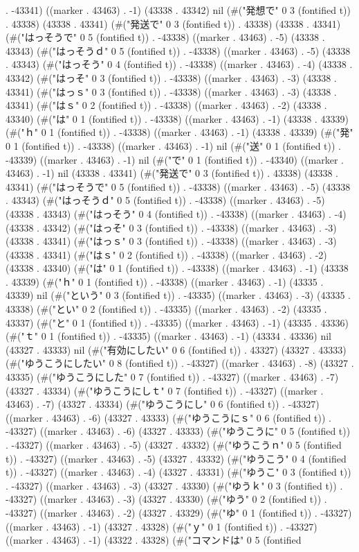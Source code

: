 . -43341) ((marker . 43463) . -1) (43338 . 43342) nil (#("発想で" 0 3 (fontified t)) . 43338) (43338 . 43341) (#("発送で" 0 3 (fontified t)) . 43338) (43338 . 43341) (#("はっそうで" 0 5 (fontified t)) . -43338) ((marker . 43463) . -5) (43338 . 43343) (#("はっそうｄ" 0 5 (fontified t)) . -43338) ((marker . 43463) . -5) (43338 . 43343) (#("はっそう" 0 4 (fontified t)) . -43338) ((marker . 43463) . -4) (43338 . 43342) (#("はっそ" 0 3 (fontified t)) . -43338) ((marker . 43463) . -3) (43338 . 43341) (#("はっｓ" 0 3 (fontified t)) . -43338) ((marker . 43463) . -3) (43338 . 43341) (#("はｓ" 0 2 (fontified t)) . -43338) ((marker . 43463) . -2) (43338 . 43340) (#("は" 0 1 (fontified t)) . -43338) ((marker . 43463) . -1) (43338 . 43339) (#("ｈ" 0 1 (fontified t)) . -43338) ((marker . 43463) . -1) (43338 . 43339) (#("発" 0 1 (fontified t)) . -43338) ((marker . 43463) . -1) nil (#("送" 0 1 (fontified t)) . -43339) ((marker . 43463) . -1) nil (#("で" 0 1 (fontified t)) . -43340) ((marker . 43463) . -1) nil (43338 . 43341) (#("発送で" 0 3 (fontified t)) . 43338) (43338 . 43341) (#("はっそうで" 0 5 (fontified t)) . -43338) ((marker . 43463) . -5) (43338 . 43343) (#("はっそうｄ" 0 5 (fontified t)) . -43338) ((marker . 43463) . -5) (43338 . 43343) (#("はっそう" 0 4 (fontified t)) . -43338) ((marker . 43463) . -4) (43338 . 43342) (#("はっそ" 0 3 (fontified t)) . -43338) ((marker . 43463) . -3) (43338 . 43341) (#("はっｓ" 0 3 (fontified t)) . -43338) ((marker . 43463) . -3) (43338 . 43341) (#("はｓ" 0 2 (fontified t)) . -43338) ((marker . 43463) . -2) (43338 . 43340) (#("は" 0 1 (fontified t)) . -43338) ((marker . 43463) . -1) (43338 . 43339) (#("ｈ" 0 1 (fontified t)) . -43338) ((marker . 43463) . -1) (43335 . 43339) nil (#("という" 0 3 (fontified t)) . -43335) ((marker . 43463) . -3) (43335 . 43338) (#("とい" 0 2 (fontified t)) . -43335) ((marker . 43463) . -2) (43335 . 43337) (#("と" 0 1 (fontified t)) . -43335) ((marker . 43463) . -1) (43335 . 43336) (#("ｔ" 0 1 (fontified t)) . -43335) ((marker . 43463) . -1) (43334 . 43336) nil (43327 . 43333) nil (#("有効にしたい" 0 6 (fontified t)) . 43327) (43327 . 43333) (#("ゆうこうにしたい" 0 8 (fontified t)) . -43327) ((marker . 43463) . -8) (43327 . 43335) (#("ゆうこうにした" 0 7 (fontified t)) . -43327) ((marker . 43463) . -7) (43327 . 43334) (#("ゆうこうにしｔ" 0 7 (fontified t)) . -43327) ((marker . 43463) . -7) (43327 . 43334) (#("ゆうこうにし" 0 6 (fontified t)) . -43327) ((marker . 43463) . -6) (43327 . 43333) (#("ゆうこうにｓ" 0 6 (fontified t)) . -43327) ((marker . 43463) . -6) (43327 . 43333) (#("ゆうこうに" 0 5 (fontified t)) . -43327) ((marker . 43463) . -5) (43327 . 43332) (#("ゆうこうｎ" 0 5 (fontified t)) . -43327) ((marker . 43463) . -5) (43327 . 43332) (#("ゆうこう" 0 4 (fontified t)) . -43327) ((marker . 43463) . -4) (43327 . 43331) (#("ゆうこ" 0 3 (fontified t)) . -43327) ((marker . 43463) . -3) (43327 . 43330) (#("ゆうｋ" 0 3 (fontified t)) . -43327) ((marker . 43463) . -3) (43327 . 43330) (#("ゆう" 0 2 (fontified t)) . -43327) ((marker . 43463) . -2) (43327 . 43329) (#("ゆ" 0 1 (fontified t)) . -43327) ((marker . 43463) . -1) (43327 . 43328) (#("ｙ" 0 1 (fontified t)) . -43327) ((marker . 43463) . -1) (43322 . 43328) (#("コマンドは" 0 5 (fontified 